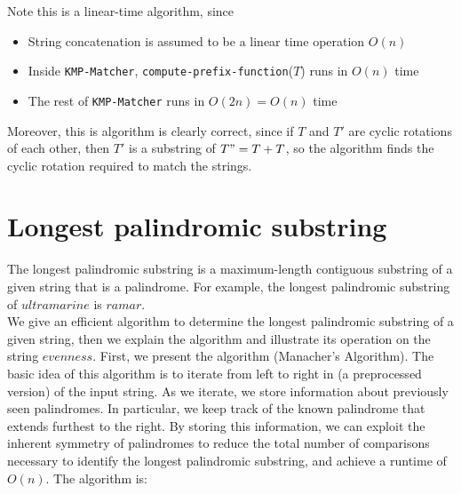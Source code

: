 \documentclass[paper=a4, fontsize=11pt]{scrartcl} %
\numberwithin{equation}{section} %
\numberwithin{figure}{section} %
\numberwithin{table}{section} %
\begin{document}
Note this is a linear-time algorithm, since
\begin{itemize}
\item String concatenation is assumed to be a linear time operation $O(n)$
\item Inside \texttt{KMP-Matcher}, \texttt{compute-prefix-function}($T$) runs in $O(n)$ time
\item The rest of \texttt{KMP-Matcher} runs in $O(2n) = O(n)$ time
\end{itemize}

Moreover, this is algorithm is clearly correct, since if $T$ and $T'$ are cyclic rotations of each other, then $T'$ is a substring of $T" = T + T$, so the algorithm finds the cyclic rotation required to match the strings.


\section{Longest palindromic substring}

The longest palindromic substring is a maximum-length contiguous substring of a given string that is a palindrome. For example, the longest palindromic substring of $ultramarine$ is $ramar$. \\

We give an efficient algorithm to determine the longest palindromic substring of a given string, then we explain the algorithm and illustrate its operation on the string $evenness$. First, we present the algorithm (Manacher's Algorithm). The basic idea of this algorithm is to iterate from left to right in (a preprocessed version) of the input string. As we iterate, we  store information about previously seen palindromes. In particular, we keep track of the known palindrome that extends furthest to the right. By storing this information, we can exploit the inherent symmetry of palindromes to reduce the total number of comparisons necessary to identify the longest palindromic substring, and achieve a runtime of $O(n)$. The algorithm is: \\
\end{document}
